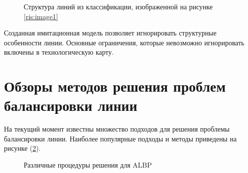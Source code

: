 \begin{figure}[H]
    \caption{Структура линий из классификации, изображенной на рисунке \ref{ris:image1}}
    \label{ris:shapeOfLines}
\end{figure}

Созданная имитационная модель позволяет игнорировать структурные особенности линии. Основные ограничения, которые невозможно игнорировать включены в технологическую карту. 




\section{Обзоры методов решения проблем балансировки линии}

На текущий момент известны множество подходов для решения проблемы балансировки линии. Наиболее популярные подходы и методы приведены на рисунке (\ref{ris:Approaches}).

\begin{figure}[H]
    \caption{Различные процедуры решения для ALBP}
    \label{ris:Approaches}
\end{figure}


